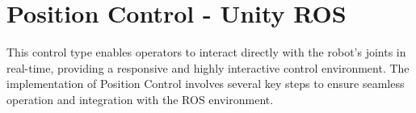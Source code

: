     
    \section{Position Control - Unity ROS}
    This control type enables operators to interact directly with the robot's joints in real-time, providing a responsive and highly interactive control environment. The implementation of Position Control involves several key steps to ensure seamless operation and integration with the ROS environment.
    

